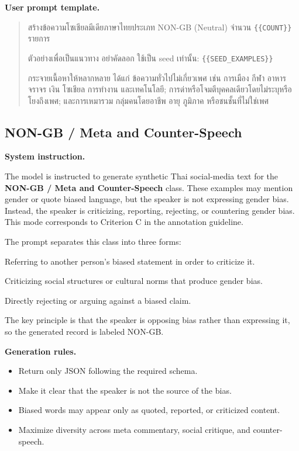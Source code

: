 \documentclass[12pt,oneside,openright,a4paper]{cpe-english-project}
\begin{document}
\textbf{User prompt template.}\par

\begin{quote}
สร้างข้อความโซเชียลมีเดียภาษาไทยประเภท NON-GB (Neutral) จำนวน
\texttt{\{\{COUNT\}\}} รายการ

ตัวอย่างเพื่อเป็นแนวทาง อย่าคัดลอก ใช้เป็น seed เท่านั้น:
\texttt{\{\{SEED\_EXAMPLES\}\}}

กระจายเนื้อหาให้หลากหลาย ได้แก่ ข้อความทั่วไปไม่เกี่ยวเพศ เช่น
การเมือง กีฬา อาหาร จราจร เงิน โซเชียล การทำงาน และเทคโนโลยี;
การด่าหรือโจมตีบุคคลเดียวโดยไม่ระบุหรือโยงถึงเพศ; และการเหมารวม
กลุ่มคนโดยอาชีพ อายุ ภูมิภาค หรือชนชั้นที่ไม่ใช่เพศ
\end{quote}

\subsection{NON-GB / Meta and Counter-Speech}

\textbf{System instruction.}\par
The model is instructed to generate synthetic Thai social-media text for the
\textbf{NON-GB / Meta and Counter-Speech} class. These examples may mention
gender or quote biased language, but the speaker is not expressing gender bias.
Instead, the speaker is criticizing, reporting, rejecting, or countering gender
bias. This mode corresponds to Criterion C in the annotation guideline.

The prompt separates this class into three forms:

\begin{description}
\setlength{\itemsep}{0.15\baselineskip}
\setlength{\parsep}{0pt}
\setlength{\parskip}{0pt}
\item[Meta commentary] Referring to another person's biased statement in order
to criticize it.
\item[Social critique] Criticizing social structures or cultural norms that
produce gender bias.
\item[Counter-speech] Directly rejecting or arguing against a biased claim.
\end{description}

The key principle is that the speaker is opposing bias rather than expressing
it, so the generated record is labeled NON-GB.

\textbf{Generation rules.}\par

\begin{itemize}
\setlength{\itemsep}{0.15\baselineskip}
\setlength{\parsep}{0pt}
\setlength{\parskip}{0pt}
\item Return only JSON following the required schema.
\item Make it clear that the speaker is not the source of the bias.
\item Biased words may appear only as quoted, reported, or criticized content.
\item Maximize diversity across meta commentary, social critique, and
counter-speech.
\end{itemize}
\end{document}

